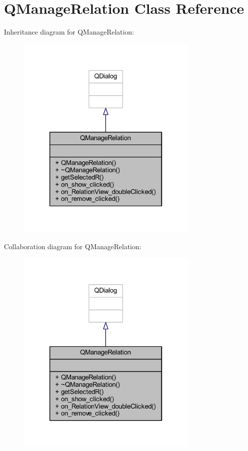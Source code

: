 \hypertarget{class_q_manage_relation}{}\section{Q\+Manage\+Relation Class Reference}
\label{class_q_manage_relation}


Inheritance diagram for Q\+Manage\+Relation\+:
\nopagebreak
\begin{figure}[H]
\begin{center}
\leavevmode
\includegraphics[width=250pt]{class_q_manage_relation__inherit__graph}
\end{center}
\end{figure}


Collaboration diagram for Q\+Manage\+Relation\+:
\nopagebreak
\begin{figure}[H]
\begin{center}
\leavevmode
\includegraphics[width=250pt]{class_q_manage_relation__coll__graph}
\end{center}
\end{figure}
